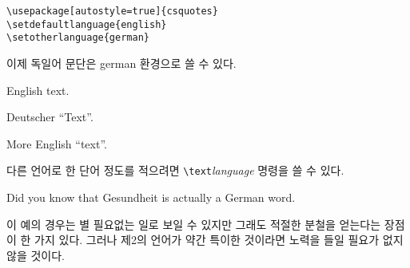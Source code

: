 \begin{lscommand}
\verb|\usepackage[autostyle=true]{csquotes}|\\
\verb|\setdefaultlanguage{english}|\\
\verb|\setotherlanguage{german}|
\end{lscommand}
이제 독일어 문단은 german 환경으로 쓸 수 있다.

\begin{example}
English text.
\begin{german}
Deutscher \enquote{Text}.
\end{german}
More English \enquote{text}.
\end{example}

다른 언어로 한 단어 정도를 적으려면 \verb|\text|\emph{language} 명령을 쓸 수 있다.

\begin{example}
Did you know that
\textgerman{Gesundheit} is
actually a German word.
\end{example}

이 예의 경우는 별 필요없는 일로 보일 수 있지만 그래도 적절한 분철을 얻는다는 장점이 한 가지 있다.
그러나 제2의 언어가 약간 특이한 것이라면 노력을 들일 필요가 없지 않을 것이다.


